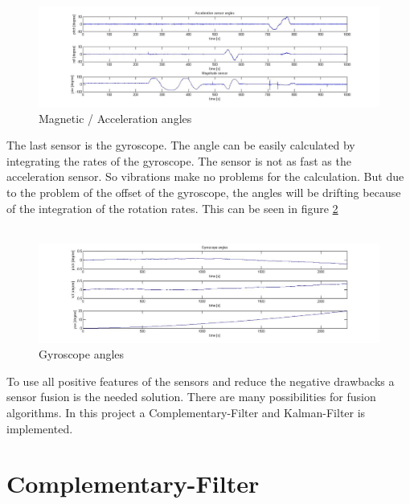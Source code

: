 \begin{figure}[H]
	\centering\includegraphics[width=1.0\textwidth]{fig/Kal_Comp/Magn_Acc.jpg}
	\caption{Magnetic / Acceleration angles}
	\label{fig:Mag_Acc}
\end{figure}

The last sensor is the gyroscope. The angle can be easily calculated by integrating the rates of the gyroscope. The sensor is not as fast as the acceleration sensor. So vibrations make no problems for the calculation. But due to the problem of the offset of the gyroscope, the angles will be drifting because of the integration of the rotation rates. This can be seen in figure \ref{fig:Comp_gyro}\\\\

\begin{figure}[H]
	\centering\includegraphics[width=1.0\textwidth]{fig/Kal_Comp/Comp_gyro.jpg}
	\caption{Gyroscope angles}
	\label{fig:Comp_gyro}
\end{figure}

To use all positive features of the sensors and reduce the negative drawbacks a sensor fusion is the needed solution. There are many possibilities for fusion algorithms. In this project a Complementary-Filter and Kalman-Filter is implemented.

\newpage
\section{Complementary-Filter}
\label{sec:ComplementaryFilter}

